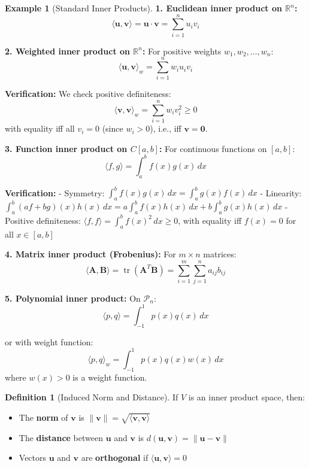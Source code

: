 \documentclass[12pt]{article}
\numberwithin{equation}{section}
\newcommand{\vect}[1]{\boldsymbol{#1}}   %
\newcommand{\mat}[1]{\mathbf{#1}}        %
\newcommand{\tr}{\operatorname{tr}}
\theoremstyle{plain}
\theoremstyle{definition}
\newtheorem{definition}[theorem]{Definition}
\newtheorem{example}[theorem]{Example}
\theoremstyle{remark}
\begin{document}
\begin{example}[Standard Inner Products]
\textbf{1. Euclidean inner product on $\mathbb{R}^n$:}
$$\langle \vect{u}, \vect{v} \rangle = \vect{u} \cdot \vect{v} = \sum_{i=1}^n u_i v_i$$

\textbf{2. Weighted inner product on $\mathbb{R}^n$:}
For positive weights $w_1, w_2, \ldots, w_n$:
$$\langle \vect{u}, \vect{v} \rangle_w = \sum_{i=1}^n w_i u_i v_i$$

\textbf{Verification:} We check positive definiteness:
$$\langle \vect{v}, \vect{v} \rangle_w = \sum_{i=1}^n w_i v_i^2 \geq 0$$
with equality iff all $v_i = 0$ (since $w_i > 0$), i.e., iff $\vect{v} = \vect{0}$.

\textbf{3. Function inner product on $C[a,b]$:}
For continuous functions on $[a,b]$:
$$\langle f, g \rangle = \int_a^b f(x)g(x) \, dx$$

\textbf{Verification:} 
- Symmetry: $\int_a^b f(x)g(x) \, dx = \int_a^b g(x)f(x) \, dx$
- Linearity: $\int_a^b (af + bg)(x)h(x) \, dx = a\int_a^b f(x)h(x) \, dx + b\int_a^b g(x)h(x) \, dx$
- Positive definiteness: $\langle f, f \rangle = \int_a^b f(x)^2 \, dx \geq 0$, with equality iff $f(x) = 0$ for all $x \in [a,b]$

\textbf{4. Matrix inner product (Frobenius):}
For $m \times n$ matrices:
$$\langle \mat{A}, \mat{B} \rangle = \tr(\mat{A}^T\mat{B}) = \sum_{i=1}^m \sum_{j=1}^n a_{ij}b_{ij}$$

\textbf{5. Polynomial inner product:}
On $\mathcal{P}_n$:
$$\langle p, q \rangle = \int_{-1}^1 p(x)q(x) \, dx$$

or with weight function:
$$\langle p, q \rangle_w = \int_{-1}^1 p(x)q(x)w(x) \, dx$$
where $w(x) > 0$ is a weight function.
\end{example}

\begin{definition}[Induced Norm and Distance]
If $V$ is an inner product space, then:
\begin{itemize}
\item The \textbf{norm} of $\vect{v}$ is $\|\vect{v}\| = \sqrt{\langle \vect{v}, \vect{v} \rangle}$
\item The \textbf{distance} between $\vect{u}$ and $\vect{v}$ is $d(\vect{u}, \vect{v}) = \|\vect{u} - \vect{v}\|$
\item Vectors $\vect{u}$ and $\vect{v}$ are \textbf{orthogonal} if $\langle \vect{u}, \vect{v} \rangle = 0$
\end{itemize}
\end{definition}
\end{document}
